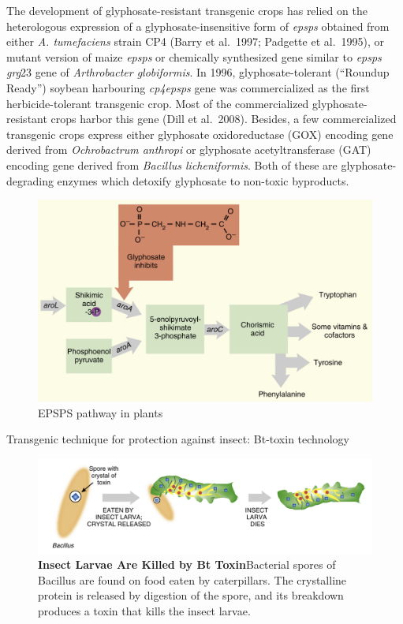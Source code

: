 \documentclass[11pt,dvipsnames,ignorenonframetext,aspectratio=169]{beamer}
\begin{document}
\begin{frame}{}
\protect\hypertarget{section-3}{}
The development of glyphosate-resistant transgenic crops has relied on
the heterologous expression of a glyphosate-insensitive form of
\emph{epsps} obtained from either \emph{A. tumefaciens} strain CP4
(Barry et al.~1997; Padgette et al.~1995), or mutant version of maize
\emph{epsps} or chemically synthesized gene similar to \emph{epsps}
\emph{grg}23 gene of \emph{Arthrobacter globiformis}. In 1996,
glyphosate-tolerant (``Roundup Ready'') soybean harbouring
\emph{cp4epsps} gene was commercialized as the first herbicide-tolerant
transgenic crop. Most of the commercialized glyphosate-resistant crops
harbor this gene (Dill et al.~2008). Besides, a few commercialized
transgenic crops express either glyphosate oxidoreductase (GOX) encoding
gene derived from \emph{Ochrobactrum anthropi} or glyphosate
acetyltransferase (GAT) encoding gene derived from \emph{Bacillus
licheniformis}. Both of these are glyphosate-degrading enzymes which
detoxify glyphosate to non-toxic byproducts.
\end{frame}

\begin{frame}{}
\protect\hypertarget{section-4}{}
\begin{figure}
\includegraphics[width=0.5\linewidth]{../images/epsps_pathway_plants} \caption{EPSPS pathway in plants}\label{fig:glyphosate-tolerance}
\end{figure}
\end{frame}

\begin{frame}{Transgenic technique for protection against insect:
Bt-toxin technology}
\protect\hypertarget{transgenic-technique-for-protection-against-insect-bt-toxin-technology}{}
\begin{figure}
\includegraphics[width=0.6\linewidth]{../images/bt_toxin_mechanism} \caption{\textbf{Insect Larvae Are Killed by Bt Toxin}Bacterial spores of Bacillus are found on food eaten by caterpillars. The crystalline protein is released by digestion of the spore, and its breakdown produces a toxin that kills the insect larvae.}\label{fig:bt-toxin-mechanism}
\end{figure}
\end{frame}
\end{document}
